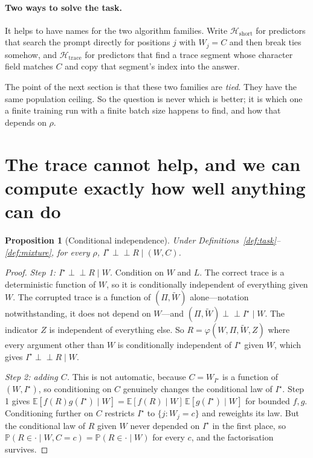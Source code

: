 \documentclass{article}
\theoremstyle{plain}
\newtheorem{proposition}{Proposition}
\theoremstyle{definition}
\theoremstyle{remark}
\newcommand{\E}{\mathbb{E}}
\newcommand{\Prob}{\mathbb{P}}
\newcommand{\1}{\mathbf{1}}
\newcommand{\cH}{\mathcal{H}}
\newcommand{\indep}{\perp\!\!\!\perp}
\begin{document}
\paragraph{Two ways to solve the task.}
It helps to have names for the two algorithm families. Write
$\cH_{\mathrm{short}}$ for predictors that search the prompt directly for
positions $j$ with $W_j=C$ and then break ties somehow, and $\cH_{\mathrm{trace}}$
for predictors that find a trace segment whose character field matches $C$ and
copy that segment's index into the answer.

The point of the next section is that these two families are \emph{tied}. They
have the same population ceiling. So the question is never which is better; it is
which one a finite training run with a finite batch size happens to find, and how
that depends on $\rho$.

\section{The trace cannot help, and we can compute exactly how well anything can do}
\label{sec:bayes}

\begin{proposition}[Conditional independence]
\label{prop:indep}
Under Definitions~\ref{def:task}--\ref{def:mixture}, for every $\rho$,
$I^\star \indep R \mid (W,C)$.
\end{proposition}

\begin{proof}
\emph{Step 1: $I^\star\indep R\mid W$.} Condition on $W$ and $L$. The correct
trace is a deterministic function of $W$, so it is conditionally independent of
everything given $W$. The corrupted trace is a function of $(\Pi,\widetilde W)$
alone---notation notwithstanding, it does not depend on $W$---and
$(\Pi,\widetilde W)\indep I^\star\mid W$. The indicator $Z$ is independent of
everything else. So $R = \varphi(W,\Pi,\widetilde W,Z)$ where every argument
other than $W$ is conditionally independent of $I^\star$ given $W$, which gives
$I^\star\indep R\mid W$.

\emph{Step 2: adding $C$.} This is not automatic, because $C=W_{I^\star}$ is a
function of $(W,I^\star)$, so conditioning on $C$ genuinely changes the
conditional law of $I^\star$. Step 1 gives
$\E[f(R)g(I^\star)\mid W] = \E[f(R)\mid W]\,\E[g(I^\star)\mid W]$ for bounded
$f,g$. Conditioning further on $C$ restricts $I^\star$ to $\{j:W_j=c\}$ and
reweights its law. But the conditional law of $R$ given $W$ never depended on
$I^\star$ in the first place, so
$\Prob(R\in\cdot\mid W,C=c) = \Prob(R\in\cdot\mid W)$ for every $c$, and the
factorisation survives.
\end{proof}
\end{document}
